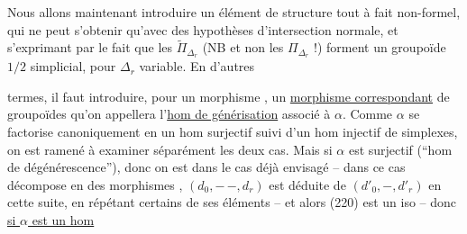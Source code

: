 Nous allons maintenant introduire
un élément de structure tout à fait
non-formel, qui ne peut s'obtenir
qu'avec des hypothèses 
d'intersection normale, et s'exprimant
par le fait que les $\widetilde\Pi_{\Delta_r}$ (NB et
non les $\Pi_{\Delta_r}$ !) forment un groupoïde
$1/2$ simplicial, pour $\Delta_r$ variable. En d'autres

termes, il faut introduire, 
pour un morphisme
,
un \uline{morphisme correspondant} de groupoïdes
qu'on appellera l'\uline{hom de générisation}
associé à $\alpha$. Comme $\alpha$ se factorise
canoniquement en un hom surjectif
suivi d'un hom injectif de simplexes,
on est ramené à examiner séparément
les deux cas. Mais si $\alpha$ est surjectif
(``hom de dégénérescence''), 
donc on est dans le cas déjà envisagé --
 dans ce cas
décompose en des morphismes \unsure{:|;}
,
$(d_0,-\,-,d_r)$ est déduite de $(d'_0,-,d'_r)$
en  cette suite, en répétant certains
de ses éléments -- et  alors (220) est
un iso -- donc \uline{si $\alpha$ est un hom}


